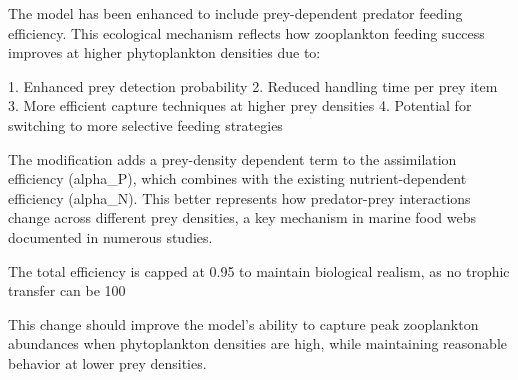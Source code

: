 The model has been enhanced to include prey-dependent predator feeding efficiency. This ecological mechanism reflects how zooplankton feeding success improves at higher phytoplankton densities due to:

1. Enhanced prey detection probability
2. Reduced handling time per prey item
3. More efficient capture techniques at higher prey densities
4. Potential for switching to more selective feeding strategies

The modification adds a prey-density dependent term to the assimilation efficiency (alpha_P), which combines with the existing nutrient-dependent efficiency (alpha_N). This better represents how predator-prey interactions change across different prey densities, a key mechanism in marine food webs documented in numerous studies.

The total efficiency is capped at 0.95 to maintain biological realism, as no trophic transfer can be 100%

This change should improve the model's ability to capture peak zooplankton abundances when phytoplankton densities are high, while maintaining reasonable behavior at lower prey densities.
